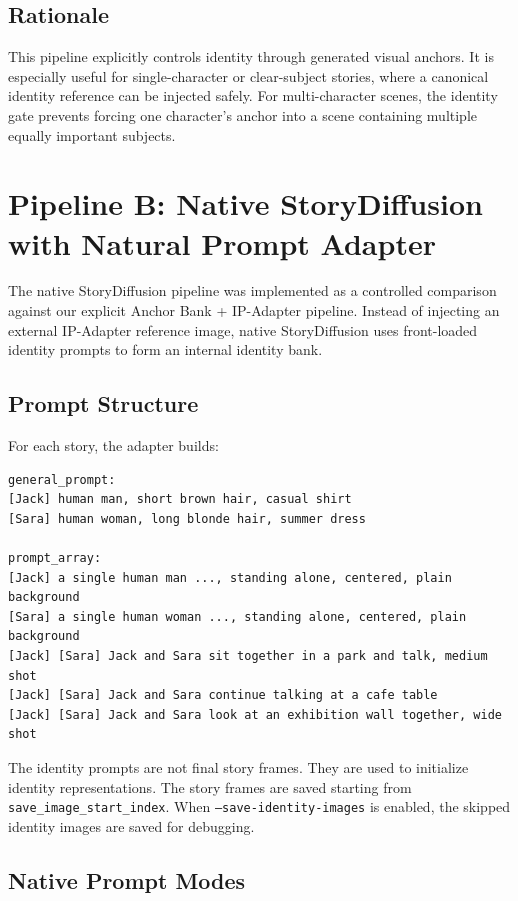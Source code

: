 \documentclass[11pt,a4paper]{article}
\begin{document}
\subsection{Rationale}

This pipeline explicitly controls identity through generated visual anchors. It is especially useful for single-character or clear-subject stories, where a canonical identity reference can be injected safely. For multi-character scenes, the identity gate prevents forcing one character's anchor into a scene containing multiple equally important subjects.

\section{Pipeline B: Native StoryDiffusion with Natural Prompt Adapter}
\label{sec:pipeline_b}

The native StoryDiffusion pipeline was implemented as a controlled comparison against our explicit Anchor Bank + IP-Adapter pipeline. Instead of injecting an external IP-Adapter reference image, native StoryDiffusion uses front-loaded identity prompts to form an internal identity bank.

\subsection{Prompt Structure}

For each story, the adapter builds:

\begin{lstlisting}
general_prompt:
[Jack] human man, short brown hair, casual shirt
[Sara] human woman, long blonde hair, summer dress

prompt_array:
[Jack] a single human man ..., standing alone, centered, plain background
[Sara] a single human woman ..., standing alone, centered, plain background
[Jack] [Sara] Jack and Sara sit together in a park and talk, medium shot
[Jack] [Sara] Jack and Sara continue talking at a cafe table
[Jack] [Sara] Jack and Sara look at an exhibition wall together, wide shot
\end{lstlisting}

The identity prompts are not final story frames. They are used to initialize identity representations. The story frames are saved starting from \texttt{save\_image\_start\_index}. When \texttt{--save-identity-images} is enabled, the skipped identity images are saved for debugging.

\subsection{Native Prompt Modes}
\end{document}
